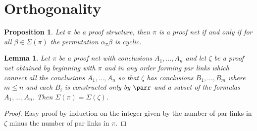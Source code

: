 \documentclass[12pt]{article}
\theoremstyle{plain}
\newtheorem{proposition}[thm]{Proposition}
\newtheorem{lemma}[thm]{Lemma}
\theoremstyle{definition}
\begin{document}
	\section{Orthogonality}
	
	
	
	
	
	
	
	
	
	\begin{proposition}
		Let $\pi$ be a proof structure, then $\pi$ is a proof net if and only if for all $\beta \in \Sigma(\pi)$ the permutation $\alpha_{\pi}\beta$ is cyclic.
	\end{proposition}
	\begin{lemma}\label{lem:pars_or_not}
		Let $\pi$ be a proof net with conclusions $A_1,...,A_n$ and let $\zeta$ be a proof net obtained by beginning with $\pi$ and in any order forming par links which connect all the conclusions $A_1,...,A_n$ so that $\zeta$ has conclusions $B_1,...,B_m$ where $m \leq n$ and each $B_i$ is constructed only by $\parr$ and a subset of the formulas $A_1,...,A_n$. Then $\Sigma(\pi) = \Sigma(\zeta)$.
	\end{lemma}
	\begin{proof}
		Easy proof by induction on the integer given by the number of par links in $\zeta$ minus the number of par links in $\pi$.
	\end{proof}
\end{document}
